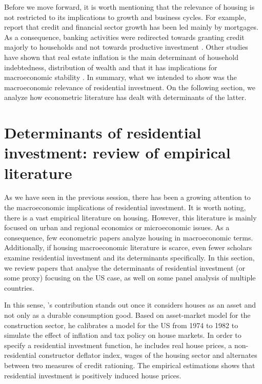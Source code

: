 \documentclass[12pt, a4paper]{article}
\begin{document}
Before we move forward, it is worth mentioning that the relevance of housing is not restricted to its implications to growth and business cycles.
For example, \textcite{jorda_great_2016} report that credit and financial sector growth has been led mainly by mortgages. 
As a consequence, banking activities were redirected towards granting credit majorly to households and not towards productive investment \cites{erturk_banks_2007}{kohl_more_2018}.
Other studies have shown that real estate inflation is the main determinant of household indebtedness, distribution of wealth and that it has implications for macroeconomic stability \cites{ryoo_household_2015}{stockhammer_debt-driven_2016}{barnes_private_2016}{johnston_global_2017}{mian_household_2017}{anderson_politics_2020}{fuller_housing_2020}. 
In summary, what we intended to show was the macroeconomic relevance of residential investment.
On the following section, we analyze how econometric literature has dealt with determinants of the latter.
\section{Determinants of residential investment: review of empirical literature}
\label{sec:org661dc22}
\label{sec:empirical_review}
As we have seen in the previous session, there has been a growing attention to the macroeconomic implications of residential investment. It is worth noting, there is a vast empirical literature on housing. However, this literature is mainly focused on urban and regional economics or microeconomic issues. As a consequence, few econometric papers analyze housing in macroeconomic terms. Additionally, if housing macroeconomic literature is scarce, even fewer scholars examine residential investment and its determinants specifically. In this section, we review papers that analyse the determinants of residential investment (or some proxy) focusing on the US case, as well on some panel analysis of multiple countries.

In this sense, \citeauthor*{poterba_tax_1984}'s \citeyear{poterba_tax_1984} contribution stands out once it considers houses as an asset and not only as a durable consumption good.
Based on asset-market model for the construction sector, he calibrates a model for the US from 1974 to 1982 to simulate the effect of inflation and tax policy on house markets.
In order to specify a residential investment function, he includes real house prices, a non-residential constructor deflator index, wages of the housing sector and alternates between two measures  of  credit  rationing.
The empirical estimations shows that residential investment is positively induced house prices.
\end{document}
